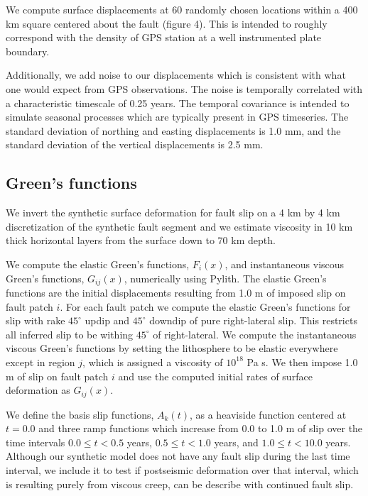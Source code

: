 \documentclass[12pt]{article}
\begin{document}
We compute surface displacements at 60 randomly chosen locations
within a 400 km square centered about the fault (figure 4).  This is
intended to roughly correspond with the density of GPS station at a
well instrumented plate boundary.

Additionally, we add noise to our displacements which is consistent
with what one would expect from GPS observations.  The noise is
temporally correlated with a characteristic timescale of 0.25 years.
The temporal covariance is intended to simulate seasonal processes
which are typically present in GPS timeseries.  The standard deviation
of northing and easting displacements is 1.0 mm, and the standard
deviation of the vertical displacements is 2.5 mm.

\subsection{Green's functions}

We invert the synthetic surface deformation for fault slip on a 4 km
by 4 km discretization of the synthetic fault segment and we estimate
viscosity in 10 km thick horizontal layers from the surface down to 70
km depth.

We compute the elastic Green's functions, $F_i(x)$, and instantaneous
viscous Green's functions, $G_{ij}(x)$, numerically using Pylith.  The
elastic Green’s functions are the initial displacements resulting from
1.0 m of imposed slip on fault patch $i$.  For each fault patch we
compute the elastic Green's functions for slip with rake $45^\circ$
updip and $45^\circ$ downdip of pure right-lateral slip.  This
restricts all inferred slip to be withing $45^\circ$ of
right-lateral. We compute the instantaneous viscous Green's functions
by setting the lithosphere to be elastic everywhere except in region
$j$, which is assigned a viscosity of $10^{18}$ Pa s.  We then impose
1.0 m of slip on fault patch $i$ and use the computed initial
rates of surface deformation as $G_{ij}(x)$.

We define the basis slip functions, $A_k(t)$, as a heaviside function
centered at $t=0.0$ and three ramp functions which increase from 0.0 to
1.0 m of slip over the time intervals $0.0\leq t < 0.5$ years,
$0.5\leq t < 1.0$ years, and $1.0\leq t < 10.0$ years.  Although our
synthetic model does not have any fault slip during the last time
interval, we include it to test if postseismic deformation over that
interval, which is resulting purely from viscous creep, can be
describe with continued fault slip.
\end{document}
